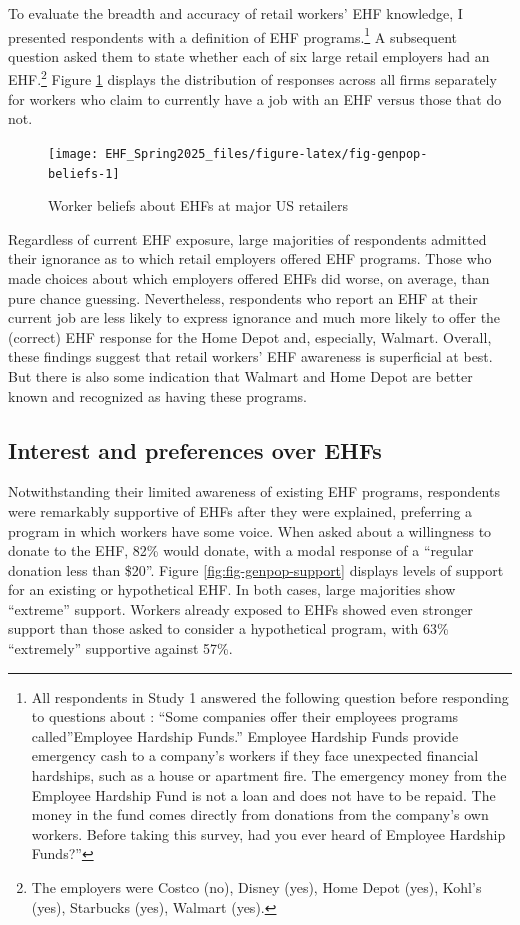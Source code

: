 \documentclass[
  11pt,
  oneside]{article}
\begin{document}
To evaluate the breadth and accuracy of retail workers' EHF knowledge, I presented respondents with a definition of EHF programs.\footnote{All respondents in Study 1 answered the following question before responding to questions about : ``Some companies offer their employees programs called''Employee Hardship Funds.'' Employee Hardship Funds provide emergency cash to a company's workers if they face unexpected financial hardships, such as a house or apartment fire. The emergency money from the Employee Hardship Fund is not a loan and does not have to be repaid. The money in the fund comes directly from donations from the company's own workers. Before taking this survey, had you ever heard of Employee Hardship Funds?''} A subsequent question asked them to state whether each of six large retail employers had an EHF.\footnote{The employers were Costco (no), Disney (yes), Home Depot (yes), Kohl's (yes), Starbucks (yes), Walmart (yes).} Figure \ref{fig:fig-genpop-beliefs} displays the distribution of responses across all firms separately for workers who claim to currently have a job with an EHF versus those that do not.

\begin{figure}
\texttt{[image: EHF\_Spring2025\_files/figure-latex/fig-genpop-beliefs-1]} \caption{Worker beliefs about EHFs at major US retailers}\label{fig:fig-genpop-beliefs}
\end{figure}

Regardless of current EHF exposure, large majorities of respondents admitted their ignorance as to which retail employers offered EHF programs. Those who made choices about which employers offered EHFs did worse, on average, than pure chance guessing. Nevertheless, respondents who report an EHF at their current job are less likely to express ignorance and much more likely to offer the (correct) EHF response for the Home Depot and, especially, Walmart. Overall, these findings suggest that retail workers' EHF awareness is superficial at best. But there is also some indication that Walmart and Home Depot are better known and recognized as having these programs.

\subsection{Interest and preferences over EHFs}\label{interest-and-preferences-over-ehfs}

Notwithstanding their limited awareness of existing EHF programs, respondents were remarkably supportive of EHFs after they were explained, preferring a program in which workers have some voice. When asked about a willingness to donate to the EHF, 82\% would donate, with a modal response of a ``regular donation less than \$20''. Figure \ref{fig:fig-genpop-support} displays levels of support for an existing or hypothetical EHF. In both cases, large majorities show ``extreme'' support. Workers already exposed to EHFs showed even stronger support than those asked to consider a hypothetical program, with 63\% ``extremely'' supportive against 57\%.
\end{document}
